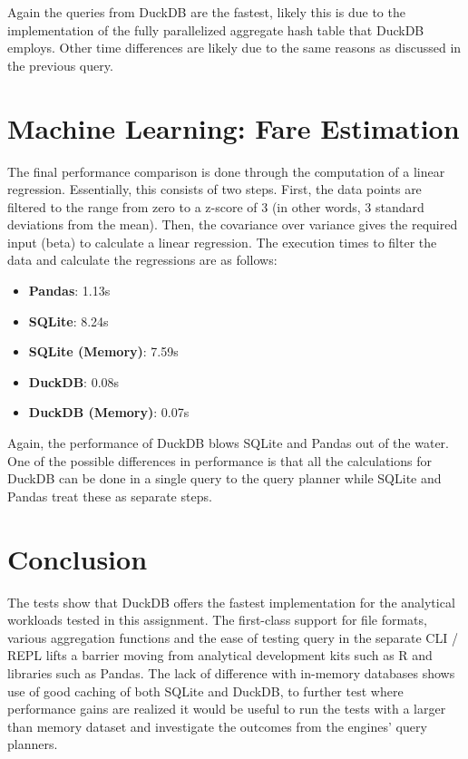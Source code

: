 \documentclass[a4paper,10pt]{article}
\begin{document}
Again the queries from DuckDB are the fastest, likely this is due to the implementation
of the fully parallelized aggregate hash table that DuckDB employs. Other time differences
are likely due to the same reasons as discussed in the previous query.

\section{Machine Learning: Fare Estimation}

The final performance comparison is done through the computation of a linear regression.
Essentially, this consists of two steps. First, the data points are filtered to the range
from zero to a z-score of 3 (in other words, 3 standard deviations from the mean). Then,
the covariance over variance gives the required input (beta) to calculate a linear 
regression. The execution times to filter the data and calculate the regressions are 
as follows:

\begin{itemize}
  \item \textbf{Pandas}: 1.13s
  \item \textbf{SQLite}: 8.24s
  \item \textbf{SQLite (Memory)}: 7.59s
  \item \textbf{DuckDB}: 0.08s
  \item \textbf{DuckDB (Memory)}: 0.07s
\end{itemize}

Again, the performance of DuckDB blows SQLite and Pandas out of the water.
One of the possible differences in performance is that all the calculations for DuckDB
can be done in a single query to the query planner while SQLite and Pandas treat these
as separate steps.

\section{Conclusion}

The tests show that DuckDB offers the fastest implementation for the analytical workloads
tested in this assignment. The first-class support for file formats, various aggregation 
functions and the ease of testing query in the separate CLI / REPL lifts a barrier moving 
from analytical development kits such as R and libraries such as Pandas.
The lack of difference with in-memory databases shows use of good caching 
of both SQLite and DuckDB, to further test where performance gains are realized it would
be useful to run the tests with a larger than memory dataset and investigate the outcomes
from the engines' query planners.
\end{document}
